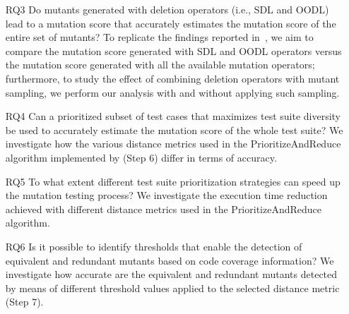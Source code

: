 \begin{itemize}
    \item[RQ3]  {Do mutants generated with deletion operators (i.e., SDL and OODL) lead to a mutation score that accurately estimates the mutation score of the entire set of mutants?  
    To replicate the findings reported in~\cite{delamaro2014experimental},
    we aim to compare the mutation score generated with SDL and OODL operators versus the mutation score generated with all the available mutation operators; furthermore, to study the effect of combining deletion operators with mutant sampling,
    we perform our analysis with and without applying such sampling.}
    
    
    \item[RQ4] Can a prioritized subset of test cases that maximizes test suite diversity be used to accurately estimate the mutation score of the whole test suite?
    We investigate how the various distance metrics used in the PrioritizeAndReduce algorithm implemented by \APPR  (Step 6) differ in terms of accuracy. 
    

    \item[RQ5] To what extent different test suite prioritization strategies can speed up the mutation testing process? We investigate the execution time reduction achieved with different distance metrics used in the PrioritizeAndReduce algorithm. 
    

    \item[RQ6] Is it possible to identify thresholds that enable the detection of equivalent and redundant mutants based on code coverage information? We investigate how accurate are the equivalent and redundant mutants detected by means of different threshold values applied to the selected distance metric  (\APPR  Step 7).
    


\end{itemize}
